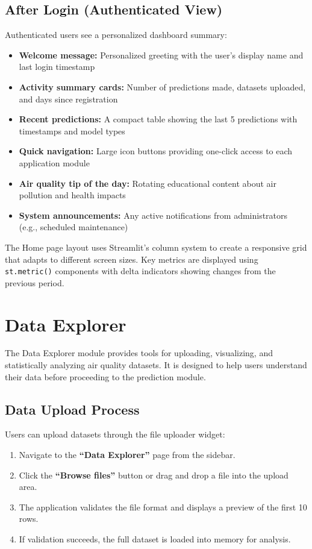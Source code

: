 \subsection{After Login (Authenticated View)}

Authenticated users see a personalized dashboard summary:

\begin{itemize}
    \item \textbf{Welcome message:} Personalized greeting with the user's display name and last login timestamp
    \item \textbf{Activity summary cards:} Number of predictions made, datasets uploaded, and days since registration
    \item \textbf{Recent predictions:} A compact table showing the last 5 predictions with timestamps and model types
    \item \textbf{Quick navigation:} Large icon buttons providing one-click access to each application module
    \item \textbf{Air quality tip of the day:} Rotating educational content about air pollution and health impacts
    \item \textbf{System announcements:} Any active notifications from administrators (e.g., scheduled maintenance)
\end{itemize}

\noindent The Home page layout uses Streamlit's column system to create a responsive grid that adapts to different screen sizes. Key metrics are displayed using \texttt{st.metric()} components with delta indicators showing changes from the previous period.


\section{Data Explorer}
\label{sec:user-explorer}

The Data Explorer module provides tools for uploading, visualizing, and statistically analyzing air quality datasets. It is designed to help users understand their data before proceeding to the prediction module.

\subsection{Data Upload Process}

Users can upload datasets through the file uploader widget:

\begin{enumerate}
    \item Navigate to the \textbf{``Data Explorer''} page from the sidebar.
    \item Click the \textbf{``Browse files''} button or drag and drop a file into the upload area.
    \item The application validates the file format and displays a preview of the first 10 rows.
    \item If validation succeeds, the full dataset is loaded into memory for analysis.
\end{enumerate}

